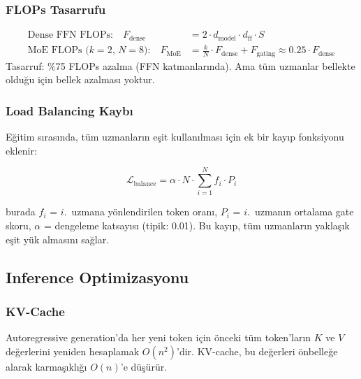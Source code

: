 \subsubsection{FLOPs Tasarrufu}

\begin{formulbox}
\begin{align}
\text{Dense FFN FLOPs:} \quad F_{\text{dense}} &= 2 \cdot d_{\text{model}} \cdot d_{\text{ff}} \cdot S \label{eq:dense-flops} \\
\text{MoE FLOPs ($k{=}2$, $N{=}8$):} \quad F_{\text{MoE}} &= \frac{k}{N} \cdot F_{\text{dense}} + F_{\text{gating}} \approx 0.25 \cdot F_{\text{dense}} \label{eq:moe-flops}
\end{align}
Tasarruf: \%75 FLOPs azalma (FFN katmanlar{\i}nda). Ama t\"{u}m uzmanlar bellekte oldu\u{g}u i\c{c}in bellek azalmas{\i} yoktur.
\end{formulbox}

\subsubsection{Load Balancing Kayb{\i}}

E\u{g}itim s{\i}ras{\i}nda, t\"{u}m uzmanlar{\i}n e\c{s}it kullan{\i}lmas{\i} i\c{c}in ek bir kay{\i}p fonksiyonu eklenir:

\begin{equation}
\mathcal{L}_{\text{balance}} = \alpha \cdot N \cdot \sum_{i=1}^{N} f_i \cdot P_i
\label{eq:load-balance}
\end{equation}

burada $f_i$ = $i$.~uzmana y\"{o}nlendirilen token oran{\i}, $P_i$ = $i$.~uzman{\i}n ortalama gate skoru, $\alpha$ = dengeleme katsay{\i}s{\i} (tipik: 0.01). Bu kay{\i}p, t\"{u}m uzmanlar{\i}n yakla\c{s}{\i}k e\c{s}it y\"{u}k almas{\i}n{\i} sa\u{g}lar.


\subsection{Inference Optimizasyonu}
\label{sec:inference-opt}

\subsubsection{KV-Cache}

\begin{tanim}
Autoregressive generation'da her yeni token i\c{c}in \"{o}nceki t\"{u}m token'lar{\i}n $K$ ve $V$ de\u{g}erlerini yeniden hesaplamak $O(n^2)$'dir. KV-cache, bu de\u{g}erleri \"{o}nbelle\u{g}e alarak karma\c{s}{\i}kl{\i}\u{g}{\i} $O(n)$'e d\"{u}\c{s}\"{u}r\"{u}r.
\end{tanim}

